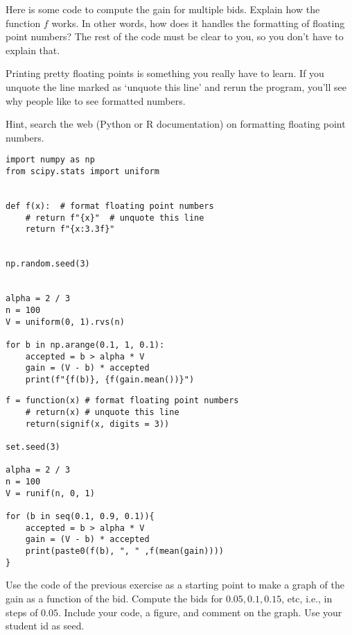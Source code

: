 \begin{exercise}
Here is some code to compute the gain for multiple bids. Explain how the function $f$ works. In other words, how does it handles the formatting of floating point numbers? The rest of the code must be clear to you, so you don't have to explain that.

Printing pretty floating points is something you really have to learn. If you unquote the line marked as `unquote this line' and rerun the program, you'll see why people like to see formatted numbers.

Hint, search the web (Python or R documentation) on formatting floating point numbers.
\begin{verbatim}
import numpy as np
from scipy.stats import uniform


def f(x):  # format floating point numbers
    # return f"{x}"  # unquote this line
    return f"{x:3.3f}"


np.random.seed(3)


alpha = 2 / 3
n = 100
V = uniform(0, 1).rvs(n)

for b in np.arange(0.1, 1, 0.1):
    accepted = b > alpha * V
    gain = (V - b) * accepted
    print(f"{f(b)}, {f(gain.mean())}")
\end{verbatim}

\begin{verbatim}
f = function(x) # format floating point numbers
    # return(x) # unquote this line
    return(signif(x, digits = 3))

set.seed(3)

alpha = 2 / 3
n = 100
V = runif(n, 0, 1)

for (b in seq(0.1, 0.9, 0.1)){
    accepted = b > alpha * V
    gain = (V - b) * accepted
    print(paste0(f(b), ", " ,f(mean(gain))))
}
\end{verbatim}
\end{exercise}


\begin{exercise}
Use the  code of the previous exercise as a starting point to make a graph of the gain as a function of the bid. Compute the bids for $0.05, 0.1, 0.15$, etc, i.e., in steps of $0.05$. Include your code, a figure, and comment on the graph.  Use your student id as seed.
\end{exercise}


